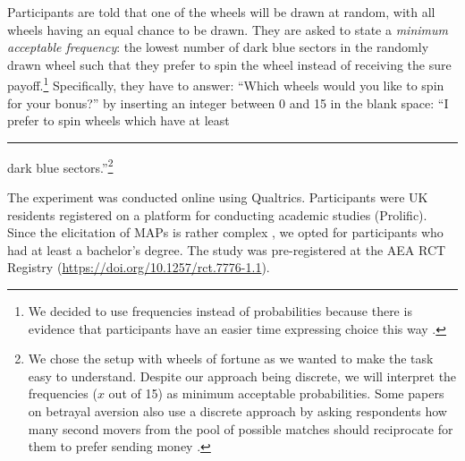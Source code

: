 Participants are told that one of the wheels will be drawn at random, with all wheels having an equal chance to be drawn.
They are asked to state a \textit{minimum acceptable frequency}: the lowest number of dark blue sectors in the randomly drawn wheel such that they prefer to spin the wheel instead of receiving the sure payoff.\footnote{
We decided to use frequencies instead of probabilities because there is evidence that participants have an easier time expressing choice this way \citep{Quercia2016}.}
Specifically, they have to answer: ``Which wheels would you like to spin for your bonus?'' by inserting an integer between 0 and 15 in the blank space: ``I prefer to spin wheels which have at least \rule{1cm}{0.15mm} dark blue sectors.''\footnote{
We chose the setup with wheels of fortune as we wanted to make the task easy to understand.
Despite our approach being discrete, we will interpret the frequencies ($x$ out of 15) as minimum acceptable probabilities.
Some papers on betrayal aversion also use a discrete approach by asking respondents how many second movers from the pool of possible matches should reciprocate for them to prefer sending money \citep[e.g. one of the experiments in][]{Quercia2016}.
}

The experiment was conducted online using Qualtrics.
Participants were UK residents registered on a platform for conducting academic studies (Prolific).
Since the elicitation of MAPs is rather complex \citep{Quercia2016,Polipciuc2022inout}, we opted for participants who had at least a bachelor's degree.
The study was pre-registered at the AEA RCT Registry (\url{https://doi.org/10.1257/rct.7776-1.1}).

